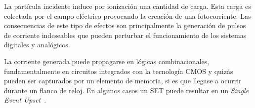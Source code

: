 La partícula incidente induce por ionización una cantidad de carga. Esta carga es colectada por el campo eléctrico provocando la creación de una fotocorriente. Las consecuencias de este tipo de efectos son principalmente la generación de pulsos de corriente indeseables que pueden perturbar el funcionamiento de los sistemas digitales y analógicos.

La corriente generada puede propagarse en lógicas combinacionales, 
 fundamentalmente en circuitos integrados con la tecnología CMOS y quizás pueden ser capturados por un elemento de memoria, si es que llegase a ocurrir durante un flanco de reloj. En algunos casos un SET puede resultar en un \textit{Single Event Upset}~\cite{ grandstrand:2004}. 
